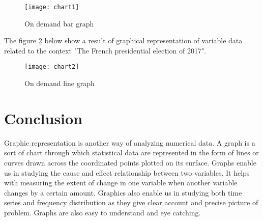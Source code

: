 \begin{figure}[H]
\centering
\texttt{[image: chart1]}
\caption{On demand bar graph }
\label{bargraph}
\end{figure}

The figure \ref{bargraph2} below show a result of graphical representation of variable data related to the context "The French presidential election of 2017".

\begin{figure}[H]
\centering
\texttt{[image: chart2]}
\caption{On demand line graph }
\label{bargraph2}
\end{figure}

\section{Conclusion}

Graphic representation is another way of analyzing numerical data. A graph is a sort of chart through which statistical data are represented in the form of lines or curves drawn across the coordinated points plotted on its surface. Graphs enable us in studying the cause and effect relationship between two variables. It helps with measuring the extent of change in one variable when another variable changes by a certain amount. Graphics also enable us in studying both time series and frequency distribution as they give clear account and precise picture of problem. Graphs are also easy to understand and eye catching.

\afterpage{\blankpage}